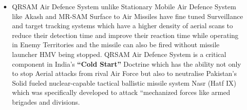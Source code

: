 \documentclass[14pt]{article} %
\begin{document}
\begin{itemize}
\item[] QRSAM Air Defence System unlike Stationary Mobile Air Defence System like Akash and MR-SAM Surface to Air Missiles have fine tuned Surveillance and target tracking systems which have a higher density of aerial scans to reduce their detection time and improve their reaction time while operating in Enemy Territories and the missile can also be fired without missile launcher HMV being stopped. QRSAM Air Defence System is a critical component in India’s \textbf{“Cold Start”} Doctrine which has the ability not only to stop Aerial attacks from rival Air Force but also to neutralise Pakistan’s Solid fueled nuclear-capable tactical ballistic missile system Nasr (Hatf IX) which was specifically developed to attack “mechanized forces like armed brigades and divisions.
\end{itemize}
\end{document}
